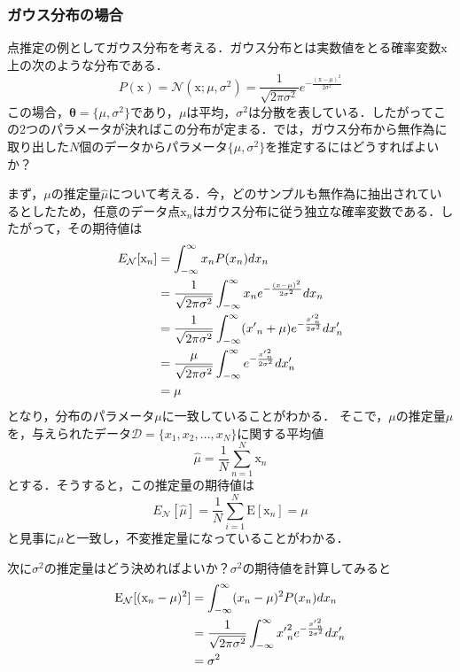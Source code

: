 \documentclass[a4paper,11pt]{jsreport}
\begin{document}
\subsubsection{ガウス分布の場合}
点推定の例としてガウス分布を考える．ガウス分布とは実数値をとる確率変数$\mathrm{x}$上の次のような分布である．
\begin{equation}
  P(\mathrm{x})
  = \mathcal{N}(\mathrm{x}; \mu, \sigma^2)
  = \frac{1}{\sqrt{2 \pi \sigma^2}} e^{-\frac{(\mathrm{x}-\mu)^2}{2\sigma^2}}
\end{equation}
この場合，$\bm{\theta} = \{ \mu, \sigma^2 \}$であり，$\mu$は平均，$\sigma^2$は分散を表している．したがってこの2つのパラメータが決ればこの分布が定まる．では，ガウス分布から無作為に取り出した$N$個のデータからパラメータ$\{ \mu, \sigma^2 \}$を推定するにはどうすればよいか？\par
まず，$\mu$の推定量$\hat{\mu}$について考える．今，どのサンプルも無作為に抽出されているとしたため，任意のデータ点$\mathrm{x}_n$はガウス分布に従う独立な確率変数である．したがって，その期待値は
\begin{align}
  E_{\mathcal{N}}[\mathrm{x}_n]
  &= \int_{-\infty}^{\infty} x_n P(x_n) dx_n \notag \\
  &= \frac{1}{\sqrt{2 \pi \sigma^2}} \int_{-\infty}^{\infty} x_n e^{-\frac{(x - \mu)^2}{2\sigma^2}} dx_n \notag \\
  &= \frac{1}{\sqrt{2 \pi \sigma^2}} \int_{-\infty}^{\infty} ({x'}_n + \mu) e^{-\frac{{x'}_n^2}{2\sigma^2}} dx'_n \notag \\
  &= \frac{\mu}{\sqrt{2 \pi \sigma^2}} \int_{-\infty}^{\infty} e^{-\frac{{x'}_n^2}{2\sigma^2}} dx'_n \notag \\
  &= \mu
\end{align}
となり，分布のパラメータ$\mu$に一致していることがわかる．
そこで，$\mu$の推定量$\hat{\mu}$を，与えられたデータ$\mathcal{D} = \{ x_1, x_2, \dots, x_N \}$に関する平均値
\begin{equation}
  \hat{\mu}
  = \frac{1}{N} \sum_{n=1}^{N} \mathrm{x}_n
\end{equation}
とする．そうすると，この推定量の期待値は
\begin{equation}
  E_{\mathcal{N}}[\hat{\mu}]
  = \frac{1}{N} \sum_{i=1}^N \mathrm{E}[\mathrm{x}_n] = \mu
\end{equation}
と見事に$\mu$と一致し，不変推定量になっていることがわかる．\par
次に$\sigma^2$の推定量はどう決めればよいか？$\sigma^2$の期待値を計算してみると
\begin{align}
  \mathrm{E}_{\mathcal{N}}[(\mathrm{x}_n - \mu)^2]
   & = \int_{-\infty}^{\infty} (x_n - \mu)^2 P(x_n) dx_n \notag \\
   & = \frac{1}{\sqrt{2 \pi \sigma^2}}\int_{-\infty}^{\infty} {x'}_n^2 e^{-\frac{{x'}_n^2}{2 \sigma^2}} dx'_n \notag \\
   & = \sigma^2
\end{align}
\end{document}
